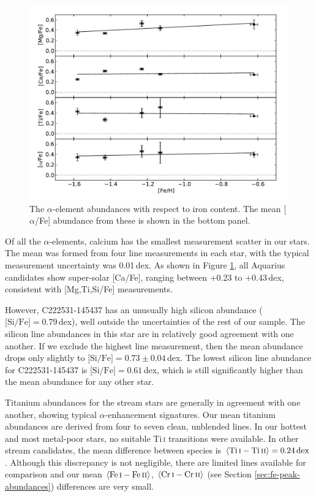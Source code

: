 \documentclass{emulateapj}
\begin{document}
\begin{figure}[h]
	\includegraphics[width=\columnwidth]{./figures/aquarius-alpha-fe.pdf}
	\caption{The $\alpha$-element abundances with respect to iron content. The mean [$\alpha$/Fe] abundance from these is shown in the bottom panel.}
	\label{fig:alpha-elements}
\end{figure}

Of all the $\alpha$-elements, calcium has the smallest measurement scatter in our stars. The mean was formed from four line measurements in each star, with the typical measurement uncertainty was 0.01\,dex. As shown in Figure \ref{fig:alpha-elements}, all Aquarius candidates show super-solar [Ca/Fe], ranging between +0.23 to +0.43\,dex, consistent with [Mg,Ti,Si/Fe] measurements. 

However, {C222531-145437} has an unusually high silicon abundance (${\mbox{[Si/Fe]} = 0.79}$\,dex), well outside the uncertainties of the rest of our sample. The silicon line abundances in this star are in relatively good agreement with one another. If we exclude the highest line measurement, then the mean abundance drops only slightly to ${\mbox{[Si/Fe]} = 0.73 \pm 0.04}$\,dex. The lowest silicon line abundance for {C222531-145437} is ${\mbox{[Si/Fe]} = 0.61}$\,dex, which is still significantly higher than the mean abundance for any other star.

Titanium abundances for the stream stars are generally in agreement with one another, showing typical $\alpha$-enhancement signatures. Our mean titanium abundances are derived from four to seven clean, unblended lines. In our hottest and most metal-poor stars, no suitable Ti\,\textsc{i} transitions were available. In other stream candidates, the mean difference between species is ${\langle{\rm Ti}\,\textsc{i} - {\rm Ti}\,\textsc{ii}\rangle = 0.24\,{\rm dex}}$. Although this discrepancy is not negligible, there are limited lines available for comparison and our mean ${\langle{\rm Fe}\,\textsc{i} - {\rm Fe}\,\textsc{ii}\rangle}$, ${\langle{\rm Cr}\,\textsc{i} - {\rm Cr}\,\textsc{ii}\rangle}$ (see Section \ref{sec:fe-peak-abundances}) differences are very small.
\end{document}
